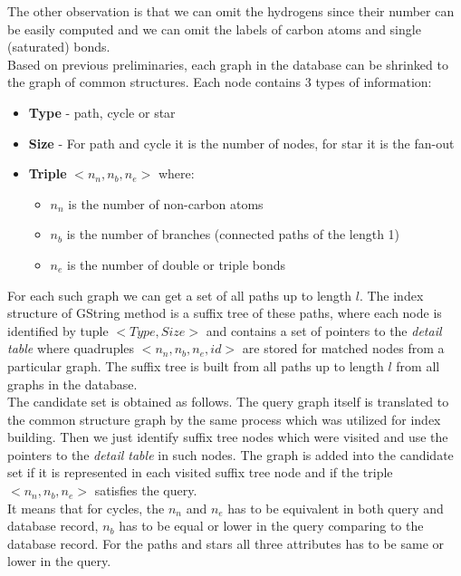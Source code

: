 The other observation is that we can omit the hydrogens since their number can be easily computed and we can omit the labels of carbon atoms and single (saturated) bonds.\\

Based on previous preliminaries, each graph in the database can be shrinked to the graph of common structures. Each node contains 3 types of information:

\begin{itemize}
	\item \textbf{Type} - path, cycle or star
	\item \textbf{Size} - For path and cycle it is the number of nodes, for star it is the fan-out
	
	\item \textbf{Triple} $ <n_{n}, n_{b}, n_{e}> $ where:
	\begin{itemize}
		\item $ n_{n} $ is the number of non-carbon atoms
		\item $ n_{b} $ is the number of branches (connected paths of the length 1)
		\item $ n_{e} $ is the number of double or triple bonds
	\end{itemize}
	
\end{itemize}

For each such graph we can get a set of all paths up to length $ l $. The index structure of GString method is a suffix tree of these paths, where each node is identified by tuple $ <Type, Size> $ and contains a set of pointers to the \textit{detail table} where quadruples $ <n_{n}, n_{b}, n_{e}, id> $ are stored for matched nodes from a particular graph. The suffix tree is built from all paths up to length $ l $ from all graphs in the database.\\

The candidate set is obtained as follows. The query graph itself is translated to the common structure graph by the same process which was utilized for index building. Then we just identify suffix tree nodes which were visited and use the pointers to the \textit{detail table} in such nodes. The graph is added into the candidate set if it is represented in each visited suffix tree node and if the triple $ <n_{n}, n_{b}, n_{e}> $ satisfies the query.\\

It means that for cycles, the $ n_{n} $ and $ n_{e} $ has to be equivalent in both query and database record, $n_{b}$ has to be equal or lower in the query comparing to the database record. For the paths and stars all three attributes has to be same or lower in the query.\\

